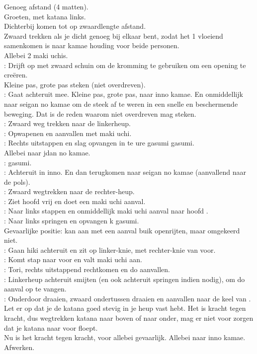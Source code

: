 Genoeg afstand (4 matten).\\
Groeten, met katana links.\\
Dichterbij komen tot op zwaardlengte afstand.\\
Zwaard trekken als je dicht genoeg bij elkaar bent, zodat het 1 vloeiend samenkomen is naar kamae houding voor beide personen.\\
Allebei 2 maki uchis.\\
\pA: Drijft op met zwaard schuin om de kromming te gebruiken om een opening te cre\"{e}ren.\\
Kleine pas, grote pas steken (niet overdreven).\\
\pB: Gaat achteruit mee. Kleine pas, grote pas, naar inno kamae. En onmiddellijk naar seigan no kamae om de steek af te weren in een snelle en beschermende beweging. Dat is de reden waarom \pa niet overdreven mag steken.\\
\pA: Zwaard weg trekken naar de linkerheup.\\
\pB: Opwapenen en aanvallen met maki uchi.\\
\pA: Rechts uitstappen en slag opvangen in te ure gasumi gasumi.\\
Allebei naar jdan no kamae.\\
\pA:  gasumi.\\
\pB: Achteruit in inno. En dan terugkomen naar seigan no kamae (aanvallend naar de pols).\\
\pA: Zwaard wegtrekken naar de rechter-heup.\\
\pB: Ziet hoofd \pa vrij en doet een maki uchi aanval.\\
\pA: Naar links stappen en onmiddellijk maki uchi aanval naar hoofd \pb.\\
\pB: Naar links springen en opvangen k gasumi.\\
Gevaarlijke positie: \pb kan aan \pa met een aanval buik openrijten, maar omgekeerd niet.\\
\pA: Gaan hiki achteruit en zit op linker-knie, met rechter-knie van voor.\\
\pB: Komt stap naar voor en valt maki uchi aan.\\
\pA: Tori, rechts uitstappend rechtkomen en do aanvallen.\\
\pB: Linkerheup achteruit smijten (en ook achteruit springen indien nodig), om do aanval op te vangen.\\
\pA: Onderdoor draaien, zwaard ondertussen draaien en aanvallen naar de keel van \pb. Let er op dat je de katana goed stevig in je heup vast hebt. Het is kracht tegen kracht, dus wegtrekken katana naar boven of naar onder, mag er niet voor zorgen dat je katana naar voor floept.\\
Nu is het kracht tegen kracht, voor allebei gevaarlijk. Allebei naar inno kamae.\\
Afwerken.

